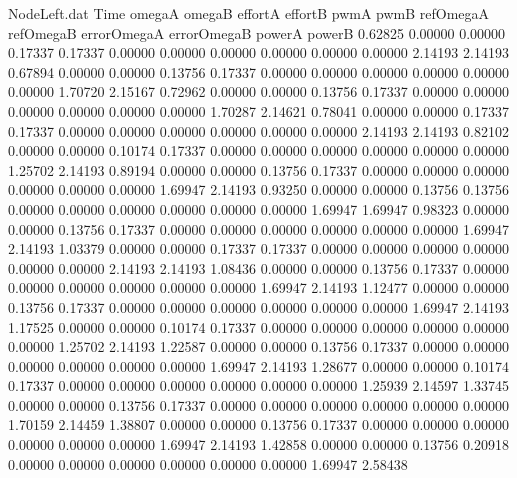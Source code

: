 \begin{filecontents}{NodeLeft.dat}
Time omegaA omegaB effortA effortB pwmA pwmB refOmegaA refOmegaB errorOmegaA errorOmegaB powerA powerB
   0.62825    0.00000    0.00000     0.17337    0.17337    0.00000    0.00000    0.00000    0.00000    0.00000    0.00000    2.14193    2.14193
   0.67894    0.00000    0.00000     0.13756    0.17337    0.00000    0.00000    0.00000    0.00000    0.00000    0.00000    1.70720    2.15167
   0.72962    0.00000    0.00000     0.13756    0.17337    0.00000    0.00000    0.00000    0.00000    0.00000    0.00000    1.70287    2.14621
   0.78041    0.00000    0.00000     0.17337    0.17337    0.00000    0.00000    0.00000    0.00000    0.00000    0.00000    2.14193    2.14193
   0.82102    0.00000    0.00000     0.10174    0.17337    0.00000    0.00000    0.00000    0.00000    0.00000    0.00000    1.25702    2.14193
   0.89194    0.00000    0.00000     0.13756    0.17337    0.00000    0.00000    0.00000    0.00000    0.00000    0.00000    1.69947    2.14193
   0.93250    0.00000    0.00000     0.13756    0.13756    0.00000    0.00000    0.00000    0.00000    0.00000    0.00000    1.69947    1.69947
   0.98323    0.00000    0.00000     0.13756    0.17337    0.00000    0.00000    0.00000    0.00000    0.00000    0.00000    1.69947    2.14193
   1.03379    0.00000    0.00000     0.17337    0.17337    0.00000    0.00000    0.00000    0.00000    0.00000    0.00000    2.14193    2.14193
   1.08436    0.00000    0.00000     0.13756    0.17337    0.00000    0.00000    0.00000    0.00000    0.00000    0.00000    1.69947    2.14193
   1.12477    0.00000    0.00000     0.13756    0.17337    0.00000    0.00000    0.00000    0.00000    0.00000    0.00000    1.69947    2.14193
   1.17525    0.00000    0.00000     0.10174    0.17337    0.00000    0.00000    0.00000    0.00000    0.00000    0.00000    1.25702    2.14193
   1.22587    0.00000    0.00000     0.13756    0.17337    0.00000    0.00000    0.00000    0.00000    0.00000    0.00000    1.69947    2.14193
   1.28677    0.00000    0.00000     0.10174    0.17337    0.00000    0.00000    0.00000    0.00000    0.00000    0.00000    1.25939    2.14597
   1.33745    0.00000    0.00000     0.13756    0.17337    0.00000    0.00000    0.00000    0.00000    0.00000    0.00000    1.70159    2.14459
   1.38807    0.00000    0.00000     0.13756    0.17337    0.00000    0.00000    0.00000    0.00000    0.00000    0.00000    1.69947    2.14193
   1.42858    0.00000    0.00000     0.13756    0.20918    0.00000    0.00000    0.00000    0.00000    0.00000    0.00000    1.69947    2.58438

\end{filecontents}
